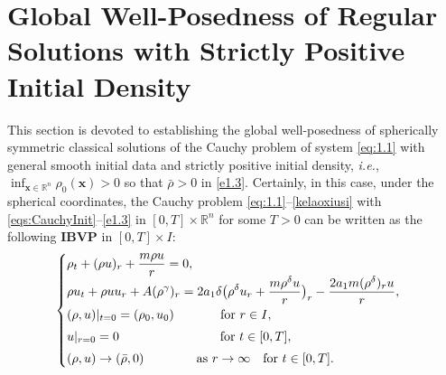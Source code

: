 \documentclass[11pt,reqno]{amsart}
\numberwithin{rk}{section}
\numberwithin{prop}{section}
\numberwithin{mydef}{section}
\numberwithin{lem}{section}
\numberwithin{equation}{section}
\numberwithin{thm}{section}
\begin{document}
\section{Global Well-Posedness of   Regular  Solutions  with Strictly Positive Initial Density}\label{nonvacuumfarfield}

This section is devoted to establishing the global well-posedness of spherically symmetric classical solutions of the Cauchy problem of system  \eqref{eq:1.1} with general smooth initial data and
strictly positive initial density, {\it i.e.}, $\inf_{\boldsymbol{x}\in \mathbb{R}^n} \rho_0(\boldsymbol{x})>0$ so that $\bar{\rho}>0$ in 
\eqref{e1.3}. Certainly, in this case, under the spherical coordinates, the Cauchy problem \eqref{eq:1.1}--\eqref{kelaoxiusi} with \eqref{eqs:CauchyInit}--\eqref{e1.3} in $[0,T]\times \mathbb{R}^n$ for some $T>0$ can be written as the following \textbf{IBVP} in $[0,T]\times I$:
\begin{equation}\label{e1.5hh-}
\begin{cases}
\displaystyle 
\rho_t+(\rho u)_r+\frac{m\rho u}{r}=0,\\[1pt]
\displaystyle
\rho u_t+\rho uu_r+A(\rho^\gamma)_r=2a_1\delta\big(\rho^\delta u_r+\frac{m\rho^\delta u}{r} \big)_r-\frac{2a_1 m(\rho^\delta)_r u}{r},\\[4pt]
\displaystyle
(\rho,u)|_{t=0}=(\rho_0,u_0) \qquad\quad\,\,\,\, \text{for $r\in I$},\\[3pt]
\displaystyle
u|_{r=0}=0 \qquad\qquad\qquad\qquad\text{for $t\in [0,T]$},\\[3pt]
\displaystyle
(\rho,u)\to \left(\bar\rho,0\right)  \qquad\qquad\text{as $r\to \infty\,$ \, for $t\in [0,T]$}.
\end{cases}
\end{equation}
\end{document}
